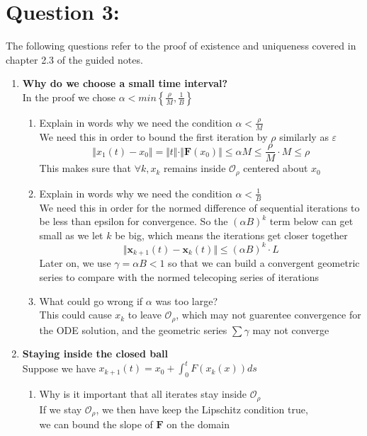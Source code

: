 \documentclass[12pt]{article}
\begin{document}
\section*{Question 3:}
The following questions refer to the proof of existence and uniqueness covered in chapter 2.3 of the guided notes.
\begin{enumerate}
    \item[a)] \textbf{Why do we choose a small time interval?} \\
    In the proof we chose $\alpha < min\left\{\frac{\rho}{M},\frac{1}{B}\right\}$
    \begin{enumerate}
        \item Explain in words why we need the condition $\alpha < \frac{\rho}{M}$ \\
        We need this in order to bound the first iteration by $\rho$ similarly as $\varepsilon$
        \[\Vert x_1(t) - x_0 \Vert = \Vert t \Vert \cdot \Vert \mathbf{F}(x_0) \Vert \leq \alpha M \leq \frac{\rho}{M} \cdot M \leq \rho\]
        This makes sure that $\forall k, x_k$ remains inside $\mathcal{O}_{\rho}$ centered about $x_0$
        
        \item Explain in words why we need the condition $\alpha < \frac{1}{B}$\\
        We need this in order for the normed difference of sequential iterations to be less than epsilon for convergence. 
        So the $(\alpha B)^k$ term below can get small as we let $k$ be big, which means the iterations get closer together
        \[\Vert \mathbf{x}_{k+1}(t) - \mathbf{x}_k(t) \Vert \leq (\alpha B)^k \cdot L\]
        Later on, we use $\gamma = \alpha B < 1$ so that we can build a convergent geometric series to compare with the normed telecoping series of iterations
        
        \item What could go wrong if $\alpha$ was too large? \\
        This could cause $x_k$ to leave $\mathcal{O}_{\rho}$, which may not guarentee convergence for the ODE solution, and the geometric series $\sum \gamma$ may not converge
    \end{enumerate}

    \item[b)] \textbf{Staying inside the closed ball} \\
    Suppose we have $x_{k+1}(t) = x_0 + \int_{0}^{t} F(x_k(x))ds$
    \begin{enumerate}
        \item Why is it important that all iterates stay inside $\mathcal{O}_{\rho}$ \\
        If we stay $\mathcal{O}_{\rho}$, we then have keep the Lipschitz condition true, \\ we can bound the slope of $\mathbf{F}$ on the domain


\end{enumerate}
\end{enumerate}
\end{document}
